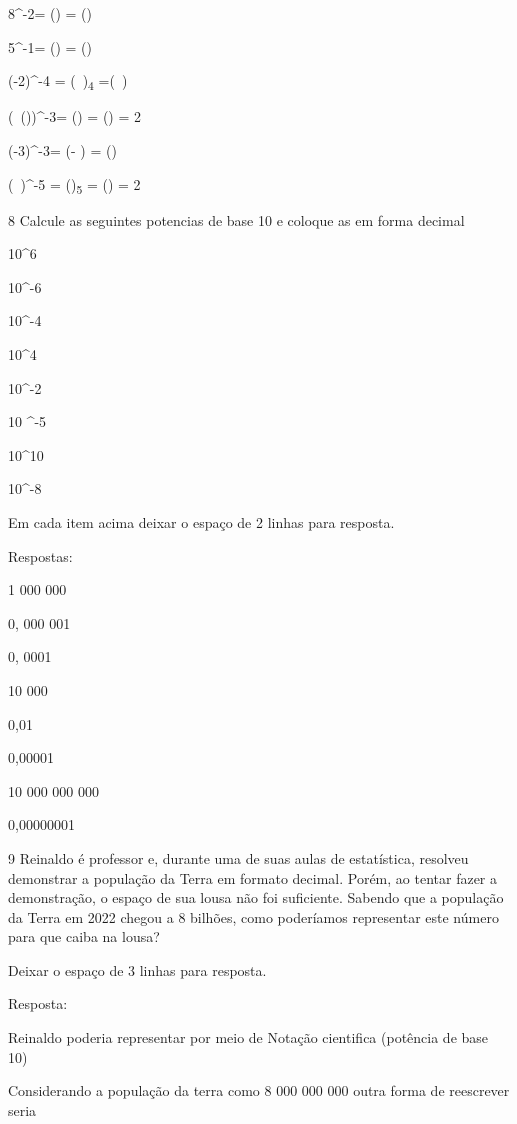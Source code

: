 \item 8^-2= () = ()
\item 5^-1= () = ()
\item (-2)^-4 = (\ )\textsubscript{4} =(\ )

\item (\ ())^-3= () =
() = 2

\item (-3)^-3= (- ) = ()
\item (\ )^-5 =
()\textsubscript{5} = () = 2

\num{8} Calcule as seguintes potencias de base 10 e coloque as em forma
decimal

\item 10^6
\item 10^-6
\item 10^-4
\item 10^4
\item 10^-2
\item 10 ^-5
\item 10^10
\item 10^-8

Em cada item acima deixar o espaço de 2 linhas para resposta.

Respostas:

\item 1 000 000
\item 0, 000 001
\item 0, 0001
\item 10 000
\item 0,01
\item 0,00001
\item 10 000 000 000
\item 0,00000001

\num{9} 
Reinaldo é professor e, durante uma de suas aulas de estatística,
resolveu demonstrar a população da Terra em formato decimal. Porém, ao
tentar fazer a demonstração, o espaço de sua lousa não foi suficiente.
Sabendo que a população da Terra em 2022 chegou a 8 bilhões, como
poderíamos representar este número para que caiba na lousa?

Deixar o espaço de 3 linhas para resposta.

Resposta:

Reinaldo poderia representar por meio de Notação cientifica (potência de
base 10)

Considerando a população da terra como 8 000 000 000 outra forma de
reescrever seria

